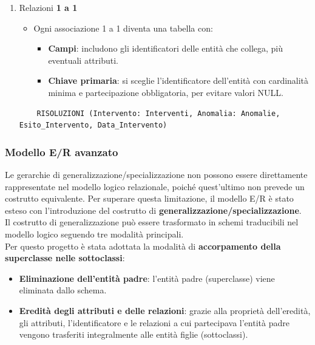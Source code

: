 \begin{enumerate}
    \item Relazioni \textbf{1 a 1}
    \begin{itemize}
        \item Ogni associazione 1 a 1 diventa una tabella con:
        \begin{itemize}
            \item \textbf{Campi}: includono gli identificatori delle entità che collega, più eventuali attributi.
            \item \textbf{Chiave primaria}: si sceglie l’identificatore dell’entità con cardinalità minima e partecipazione obbligatoria, per evitare valori NULL.
        \end{itemize}
    \end{itemize}
    \begin{lstlisting}
    RISOLUZIONI (Intervento: Interventi, Anomalia: Anomalie, Esito_Intervento, Data_Intervento)
    \end{lstlisting}
\end{enumerate}

\subsubsection{Modello E/R avanzato}

Le gerarchie di generalizzazione/specializzazione non possono essere direttamente rappresentate nel modello logico relazionale, poiché quest'ultimo non prevede un costrutto equivalente. Per superare questa limitazione, il modello E/R è stato esteso con l'introduzione del costrutto di \textbf{generalizzazione/specializzazione}. \\

Il costrutto di generalizzazione può essere trasformato in schemi traducibili nel modello logico seguendo tre modalità principali.\\

Per questo progetto è stata adottata la modalità di \textbf{accorpamento della superclasse nelle sottoclassi}:
\begin{itemize}
    \item \textbf{Eliminazione dell’entità padre}: l'entità padre (superclasse) viene eliminata dallo schema.
    \item \textbf{Eredità degli attributi e delle relazioni}: grazie alla proprietà dell’eredità, gli attributi, l’identificatore e le relazioni a cui partecipava l’entità padre vengono trasferiti integralmente alle entità figlie (sottoclassi).
\end{itemize}


